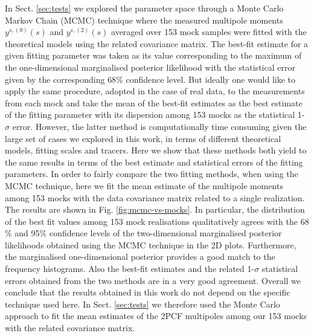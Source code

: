 \documentclass[longauth]{aa}
\begin{document}
In Sect. \ref{sec:tests} we explored the parameter space through a Monte Carlo Markov Chain (MCMC) technique where the measured multipole moments $y^{s,(0)}(s)$ and $y^{s,(2)}(s)$ averaged over 153 mock samples were fitted with the theoretical models using the related covariance matrix. The best-fit estimate for a given fitting parameter was taken as its value corresponding to the maximum of the one-dimensional marginalised posterior likelihood with the statistical error given by the corresponding $68\%$ confidence level. But ideally one would like to apply the same procedure, adopted in the case of real data, to the measurements from each mock and take the mean of the best-fit estimates as the best estimate of the fitting parameter with its dispersion among 153 mocks as the statistical 1-$\sigma$ error. However, the latter method is computationally time consuming given the large set of cases we explored in this work, in terms of different theoretical models, fitting scales and tracers. Here we show that these methods both yield to the same results in terms of the best estimate and statistical errors of the fitting parameters. In order to fairly compare the two fitting methods, when using the MCMC technique, here we fit the mean estimate of the multipole moments among 153 mocks with the data covariance matrix related to a single realization. The results are shown in Fig. \ref{fig:mcmc-vs-mocks}. In particular, the distribution of the best fit values among 153 mock realisations qualitatively agrees with the 68$\%$ and 95$\%$ confidence levels of the two-dimensional marginalised posterior likelihoods obtained using the MCMC technique in the 2D plots. Furthermore, the marginalised one-dimensional posterior provides a good match to the frequency histograms. Also the best-fit estimates and the related 1-$\sigma$ statistical errors obtained from the two methods are in a very good agreement. Overall we conclude that the results obtained in this work do not depend on the specific technique used here. In Sect. \ref{sec:tests} we therefore used the Monte Carlo approach to fit the mean estimates of the 2PCF multipoles among our 153 mocks with the related covariance matrix.
\end{document}
